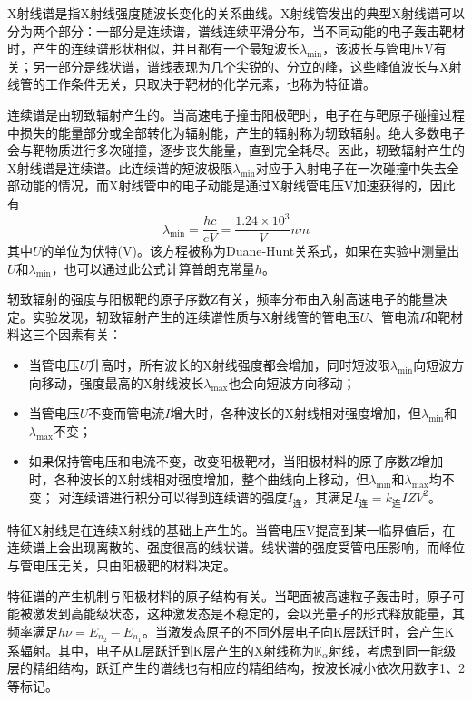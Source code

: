 \documentclass[11pt,a4paper]{article}
\begin{document}
X射线谱是指X射线强度随波长变化的关系曲线。X射线管发出的典型X射线谱可以分为两个部分：一部分是连续谱，谱线连续平滑分布，当不同动能的电子轰击靶材时，产生的连续谱形状相似，并且都有一个最短波长$\lambda_{\min}$，该波长与管电压V有关；另一部分是线状谱，谱线表现为几个尖锐的、分立的峰，这些峰值波长与X射线管的工作条件无关，只取决于靶材的化学元素，也称为特征谱。

连续谱是由轫致辐射产生的。当高速电子撞击阳极靶时，电子在与靶原子碰撞过程中损失的能量部分或全部转化为辐射能，产生的辐射称为轫致辐射。绝大多数电子会与靶物质进行多次碰撞，逐步丧失能量，直到完全耗尽。因此，轫致辐射产生的X射线谱是连续谱。此连续谱的短波极限$\lambda_{\min}$对应于入射电子在一次碰撞中失去全部动能的情况，而X射线管中的电子动能是通过X射线管电压V加速获得的，因此有
\begin{equation}
    \lambda_{\min}=\frac{hc}{eV}=\frac{1.24\times10^3}{V} nm
\end{equation}
    其中$U$的单位为伏特(V)。该方程被称为Duane-Hunt关系式，如果在实验中测量出$U$和$\lambda_{\min}$，也可以通过此公式计算普朗克常量$h$。
    
    轫致辐射的强度与阳极靶的原子序数Z有关，频率分布由入射高速电子的能量决定。实验发现，轫致辐射产生的连续谱性质与X射线管的管电压$U$、管电流$I$和靶材料这三个因素有关：
    \begin{itemize}
    \item 当管电压$U$升高时，所有波长的X射线强度都会增加，同时短波限$\lambda_{\min}$向短波方向移动，强度最高的X射线波长$\lambda_{\max}$也会向短波方向移动；
    \item 当管电压$U$不变而管电流$I$增大时，各种波长的X射线相对强度增加，但$\lambda_{\min}$和$\lambda_{\max}$不变；
    \item 如果保持管电压和电流不变，改变阳极靶材，当阳极材料的原子序数Z增加时，各种波长的X射线相对强度增加，整个曲线向上移动，但$\lambda_{\min}$和$\lambda_{\max}$均不变；
    对连续谱进行积分可以得到连续谱的强度$I_{\text{连}}$，其满足$I_{\text{连}} = k_{\text{连}} IZV^2$。
    \end{itemize}

    特征X射线是在连续X射线的基础上产生的。当管电压V提高到某一临界值后，在连续谱上会出现离散的、强度很高的线状谱。线状谱的强度受管电压影响，而峰位与管电压无关，只由阳极靶的材料决定。

特征谱的产生机制与阳极材料的原子结构有关。当靶面被高速粒子轰击时，原子可能被激发到高能级状态，这种激发态是不稳定的，会以光量子的形式释放能量，其频率满足$h\nu=E_{n_2}-E_{n_1}$。当激发态原子的不同外层电子向K层跃迁时，会产生K系辐射。其中，电子从L层跃迁到K层产生的X射线称为$\mathbb{K}_\alpha$射线，考虑到同一能级层的精细结构，跃迁产生的谱线也有相应的精细结构，按波长减小依次用数字1、2等标记。
\end{document}
